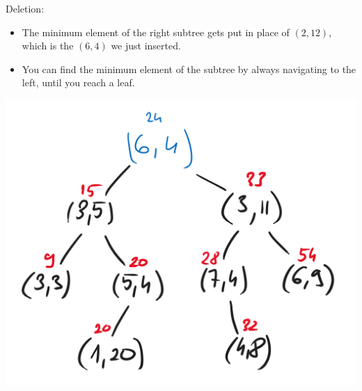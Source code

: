 Deletion:

\begin{itemize}
    \item The minimum element of the right subtree gets put in place of $(2,12)$, which is the $(6,4)$ we just inserted.
    \item You can find the minimum element of the subtree by always navigating to the left, until you reach a leaf.
\end{itemize}

\begin{center}
\includegraphics[width=0.5\linewidth]{exams/2022_06_20/06/delete.png}
\end{center}
